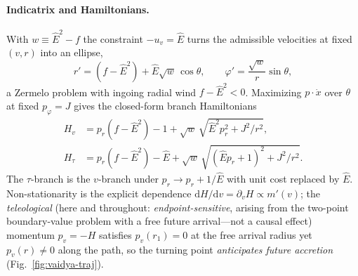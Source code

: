 \documentclass[12pt]{iopart}
\newcommand{\Ehat}{\hat E}
\newcommand{\dd}{\mathrm{d}}
\begin{document}
\paragraph{Indicatrix and Hamiltonians.} With $w\equiv\Ehat^2-f$ the constraint
$-u_v=\Ehat$ turns the admissible velocities at fixed $(v,r)$ into an ellipse,
\begin{equation}
    r'=(f-\Ehat^2)+\Ehat\sqrt w\,\cos\theta,\qquad
    \varphi'=\frac{\sqrt w}{r}\sin\theta,
    \label{eq:vaidya-ind}
\end{equation}
a Zermelo problem with ingoing radial wind $f-\Ehat^2<0$. Maximizing
$p\cdot\dot x$ over $\theta$ at fixed $p_\varphi=J$ gives the closed-form branch
Hamiltonians
\begin{align}
    H_v&=p_r(f-\Ehat^2)-1+\sqrt w\,\sqrt{\Ehat^2 p_r^2+J^2/r^2},
    \label{eq:Hv}\\
    H_\tau&=p_r(f-\Ehat^2)-\Ehat
        +\sqrt w\,\sqrt{(\Ehat p_r+1)^2+J^2/r^2}.
    \label{eq:Htau-vaidya}
\end{align}
The $\tau$-branch is the $v$-branch under $p_r\to p_r+1/\Ehat$ with unit cost
replaced by $\Ehat$. Non-stationarity is the explicit dependence
$\dd H/\dd v=\partial_v H\propto m'(v)$; the \emph{teleological} (here and
throughout: \emph{endpoint-sensitive}, arising from the two-point boundary-value
problem with a free future arrival---not a causal effect) momentum $p_v=-H$
satisfies $p_v(r_1)=0$ at the free arrival radius yet $p_v(r)\neq0$ along the
path, so the turning point \emph{anticipates future accretion}
(Fig.~\ref{fig:vaidya-traj}).
\end{document}
